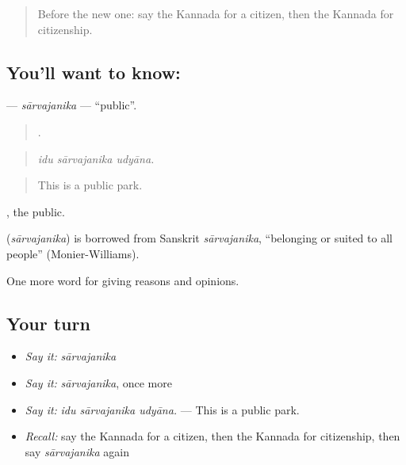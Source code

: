 \label{lesson:KA-C397-sarvajanika}



\begin{quote}
Before the new one: say the Kannada for a citizen, then the Kannada for citizenship.
\end{quote}

\subsection*{You'll want to know: }
\textbf{} — \emph{sārvajanika} — \textquotedblleft{}public\textquotedblright{}.

\begin{quote}
  .
\end{quote}

\begin{quote}
\emph{idu sārvajanika udyāna.}
\end{quote}

\begin{quote}
This is a public park.
\end{quote}

, the public.

\begin{cousinweb}
\textbf{} (\emph{sārvajanika}) is borrowed from Sanskrit \emph{sārvajanika}, \textquotedblleft{}belonging or suited to all people\textquotedblright{} (Monier-Williams).
\end{cousinweb}

\begin{grammarlens}[title={What you've built}]
One more word for giving reasons and opinions.
\end{grammarlens}

\subsection*{Your turn}
\begin{itemize}
\raggedright
  \item \emph{Say it:} \emph{sārvajanika}
  \item \emph{Say it:} \emph{sārvajanika}, once more
  \item \emph{Say it:} \emph{idu sārvajanika udyāna.} — This is a public park.
  \item \emph{Recall:} say the Kannada for a citizen, then the Kannada for citizenship, then say \emph{sārvajanika} again
\end{itemize}

